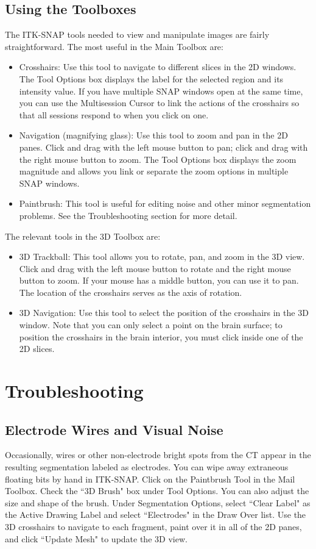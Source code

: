 \documentclass[12pt]{article}
\begin{document}
\subsection{Using the Toolboxes}
The ITK-SNAP tools needed to view and manipulate images are fairly straightforward. The most useful in the Main Toolbox are: 
\begin{itemize}
\item{Crosshairs:} Use this tool to navigate to different slices in the 2D windows. The Tool Options box displays the label for the selected region and its intensity value. If you have multiple SNAP windows open at the same time, you can use the Multisession Cursor to link the actions of the crosshairs so that all sessions respond to when you click on one.
\item{Navigation (magnifying glass)}: Use this tool to zoom and pan in the 2D panes. Click and drag with the left mouse button to pan; click and drag with the right mouse button to zoom. The Tool Options box displays the zoom magnitude and allows you link or separate the zoom options in multiple SNAP windows. 
\item{Paintbrush}: This tool is useful for editing noise and other minor segmentation problems. See the Troubleshooting section for more detail.
\end{itemize}
The relevant tools in the 3D Toolbox are:
\begin{itemize}
\item{3D Trackball}: This tool allows you to rotate, pan, and zoom in the 3D view. Click and drag with the left mouse button to rotate and the right mouse button to zoom. If your mouse has a middle button, you can use it to pan. The location of the crosshairs serves as the axis of rotation. 
\item{3D Navigation}: Use this tool to select the position of the crosshairs in the 3D window. Note that you can only select a point on the brain surface; to position the crosshairs in the brain interior, you must click inside one of the 2D slices. 
\end{itemize}




\section{Troubleshooting}

\subsection{Electrode Wires and Visual Noise}
Occasionally, wires or other non-electrode bright spots from the CT appear in the resulting segmentation labeled as electrodes. You can wipe away extraneous floating bits by hand in ITK-SNAP. Click on the Paintbrush Tool in the Mail Toolbox. Check the ``3D Brush" box under Tool Options. You can also adjust the size and shape of the brush. Under Segmentation Options, select ``Clear Label" as the Active Drawing Label and select ``Electrodes" in the Draw Over list. Use the 3D crosshairs to navigate to each fragment, paint over it in all of the 2D panes, and click ``Update Mesh" to update the 3D view.
\end{document}
